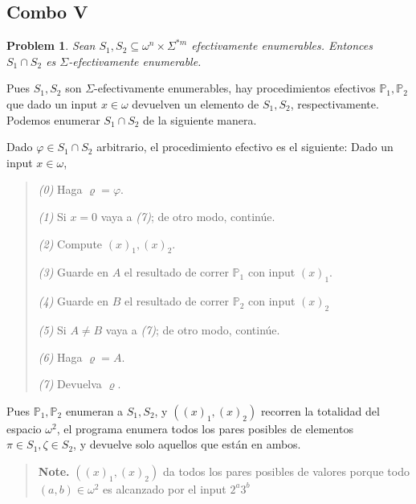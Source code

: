 \documentclass[a4paper, 12pt]{article}
\newtheorem{problem}{Problem}
\newtheorem{problem}{Problem}
\begin{document}
\pagebreak 

\subsection{Combo V}

\begin{problem}
    Sean $S_1, S_2 \subseteq \omega^{n} \times \Sigma^{*m} $ efectivamente
    enumerables. Entonces $S_1 \cap S_2$ es $\Sigma$-efectivamente enumerable.
\end{problem}

Pues $S_1, S_2$ son $\Sigma$-efectivamente enumerables, hay procedimientos
efectivos $\mathbb{P}_{1}, \mathbb{P}_2$ que dado un input $x \in \omega$
devuelven un elemento de $S_1, S_2$, respectivamente. Podemos enumerar $S_1 \cap
S_2$ de la siguiente manera.

Dado $\varphi \in S_1 \cap S_2$ arbitrario, el procedimiento efectivo es el
siguiente: Dado un input $x \in \omega$,

\small
\begin{quote}
    \textit{(0)} Haga $\varrho = \varphi$.

    \textit{(1)} Si $x = 0$ vaya a \textit{(7)}; de otro modo, continúe. 

    \textit{(2)} Compute $(x)_1, (x)_2$. 

    \textit{(3)} Guarde en $A$ el resultado de correr $\mathbb{P}_{1}$ con input
    $(x)_1$. 

    \textit{(4)} Guarde en $B$ el resultado de correr $\mathbb{P}_2$ con input
    $(x)_2$

    \textit{(5)} Si $A \neq B$ vaya a \textit{(7)}; de otro modo, continúe. 

    \textit{(6)} Haga $\varrho = A$.

    \textit{(7)} Devuelva $\varrho$.
\end{quote}

\normalsize

Pues $\mathbb{P}_1, \mathbb{P}_2$ enumeran a $S_1, S_2$, y $((x)_1, (x)_2)$
recorren la totalidad del espacio $\omega^2$,  el programa enumera todos los
pares posibles de elementos $\pi \in S_1, \zeta \in S_2$, y devuelve solo
aquellos que están en ambos.

\begin{quote}
    \textbf{Note.} $((x)_1, (x)_2)$ da todos los pares posibles de valores
    porque todo $(a, b) \in \omega^2$ es alcanzado por el input $2^a 3^b$
\end{quote}
\end{document}
